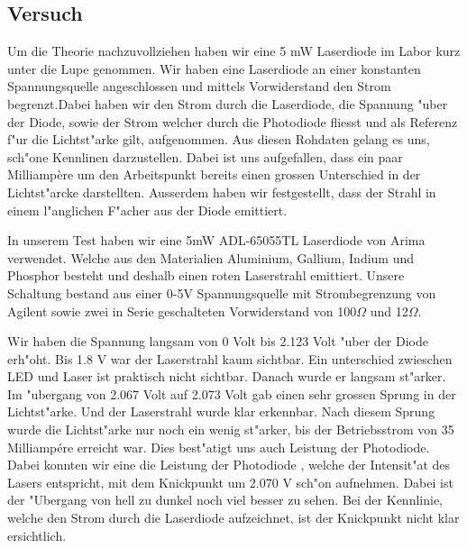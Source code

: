 \begin{refsection}
\subsection{Versuch}

Um die Theorie nachzuvollziehen haben wir eine 5 mW Laserdiode im Labor kurz 
unter die Lupe genommen. Wir haben eine Laserdiode an einer konstanten 
Spannungsquelle angeschlossen und mittels Vorwiderstand den Strom 
begrenzt.Dabei haben wir den Strom durch die Laserdiode, die Spannung "uber 
der Diode, sowie der Strom welcher durch die Photodiode fliesst und als 
Referenz f"ur die Lichtst"arke gilt, aufgenommen. Aus diesen Rohdaten gelang 
es uns, sch"one Kennlinen darzustellen. Dabei ist uns aufgefallen, dass ein 
paar Milliamp\`{e}re um den Arbeitspunkt bereits einen grossen Unterschied in
der Lichtst"arcke darstellten. Ausserdem haben wir festgestellt,
dass der Strahl in einem l"anglichen F"acher aus der Diode emittiert.

In unserem Test haben wir eine 5mW ADL-65055TL Laserdiode von Arima verwendet. 
Welche aus den Materialien Aluminium, Gallium, Indium und Phosphor besteht und 
deshalb einen roten Laserstrahl emittiert. Unsere Schaltung bestand aus einer 
0-5V Spannungsquelle mit Strombegrenzung von Agilent sowie zwei in Serie 
geschalteten Vorwiderstand von 100$\Omega$ und 12$\Omega$. 

Wir haben die Spannung langsam von 0 Volt bis 2.123 Volt "uber der Diode 
erh"oht. Bis 1.8 V war der Laserstrahl kaum sichtbar. Ein unterschied zwieschen 
LED und Laser ist praktisch nicht sichtbar. Danach wurde er langsam 
st"arker. Im "ubergang von 2.067 Volt auf 2.073 Volt gab einen sehr grossen 
Sprung in der Lichtst"arke. Und der Laserstrahl wurde klar erkennbar.
Nach diesem Sprung wurde die Lichtst"arke nur noch 
ein wenig st"arker, bis der Betriebsstrom von 35 Milliampére erreicht war. 
Dies best"atigt uns auch Leistung der Photodiode. Dabei konnten wir eine 
die Leistung der Photodiode , welche der Intensit"at des Lasers entspricht,
mit dem Knickpunkt um 2.070 V sch"on aufnehmen. 
Dabei ist 
der "Ubergang von hell zu dunkel noch viel besser zu sehen. Bei der Kennlinie, 
welche den Strom durch die Laserdiode aufzeichnet, ist der Knickpunkt nicht 
klar ersichtlich.


\end{refsection}
